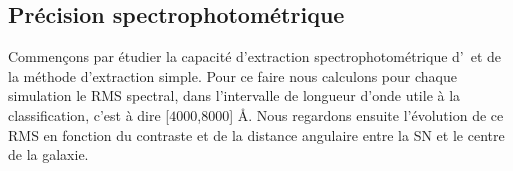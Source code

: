 \documentclass[../main/main.tex]{subfiles}
\begin{document}

\subsection{Précision spectrophotométrique}\label{ssec:spectrophotoaccuracy}

Commençons par étudier la capacité d'extraction spectrophotométrique d'\hypergal\ et de la méthode
d'extraction simple. Pour ce faire nous calculons pour chaque simulation
le RMS spectral, dans l'intervalle de longueur d'onde utile à la
classification, c'est à dire [$4000$,$8000$] \AA. Nous regardons ensuite
l'évolution de ce RMS en fonction du contraste et de la distance
angulaire entre la SN et le centre de la galaxie.
\end{document}
